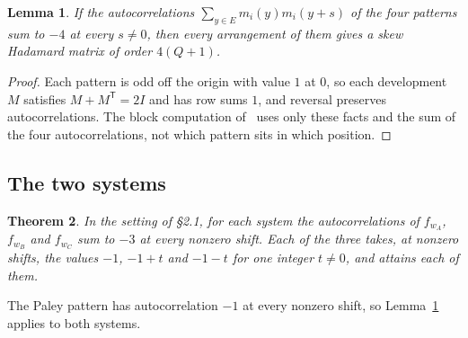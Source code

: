 \documentclass[11pt]{article}
\theoremstyle{plain}
\newtheorem{theorem}{Theorem}[section]
\newtheorem{lemma}[theorem]{Lemma}
\theoremstyle{definition}
\theoremstyle{remark}
\begin{document}
\begin{lemma}\label{lem:hadamard}
If the autocorrelations $\sum_{y\in E}m_i(y)m_i(y+s)$ of the four patterns
sum to $-4$ at every $s\ne0$, then every arrangement of them gives a skew
Hadamard matrix of order $4(Q+1)$.
\end{lemma}

\begin{proof}
Each pattern is odd off the origin with value $1$ at $0$, so each
development $M$ satisfies $M+M^{\mathsf T}=2I$ and has row sums $1$, and
reversal preserves autocorrelations. The block computation
of~\cite[\S5]{Kline18} uses only these facts and the sum of the four
autocorrelations, not which pattern sits in which position.
\end{proof}

\subsection{The two systems}

\begin{theorem}\label{thm:gauss}
In the setting of \S2.1, for each system the autocorrelations of $f_{w_A}$,
$f_{w_B}$ and $f_{w_C}$ sum to $-3$ at every nonzero shift. Each of the
three takes, at nonzero shifts, the values $-1$, $-1+t$ and $-1-t$ for one
integer $t\neq0$, and attains each of them.
\end{theorem}

The Paley pattern has autocorrelation $-1$ at every nonzero shift, so
Lemma~\ref{lem:hadamard} applies to both systems.
\end{document}
